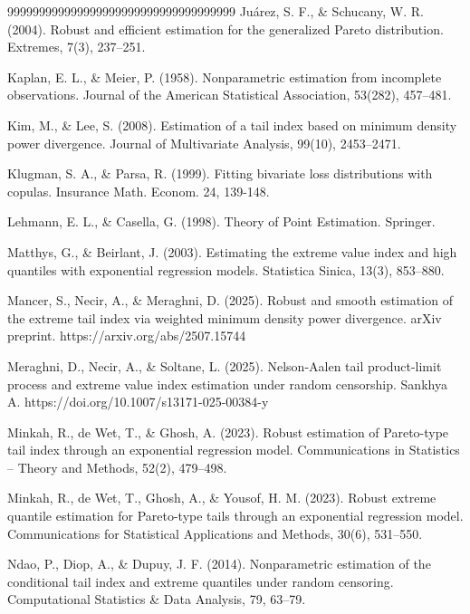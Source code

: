 \documentclass[reqno,openbib,runningheads,a4paper,12pt]{amsart}%
\begin{document}
\begin{thebibliography}{999999999999999999999999999999999999}
Ju\'{a}rez, S. F., \&
Schucany, W. R. (2004). Robust and efficient estimation for the generalized
Pareto distribution. Extremes, 7(3), 237--251.

Kaplan, E. L., \& Meier, P. (1958).
Nonparametric estimation from incomplete observations. Journal of the American
Statistical Association, 53(282), 457--481.

Kim, M., \& Lee, S. (2008). Estimation of
a tail index based on minimum density power divergence. Journal of
Multivariate Analysis, 99(10), 2453--2471.

Klugman, S. A., \& Parsa, R.
(1999). Fitting bivariate loss distributions with copulas. Insurance Math.
Econom. 24, 139-148.

Lehmann, E. L., \& Casella, G.
(1998). Theory of Point Estimation. Springer.

Matthys, G., \& Beirlant, J.
(2003). Estimating the extreme value index and high quantiles with exponential
regression models. Statistica Sinica, 13(3), 853--880.

Mancer, S., Necir, A., \&
Meraghni, D. (2025). Robust and smooth estimation of the extreme tail index
via weighted minimum density power divergence. arXiv preprint. https://arxiv.org/abs/2507.15744

Meraghni, D., Necir, A., \&
Soltane, L. (2025). Nelson-Aalen tail product-limit process and extreme value
index estimation under random censorship. Sankhya A. https://doi.org/10.1007/s13171-025-00384-y

Minkah, R., de Wet, T., \&
Ghosh, A. (2023). Robust estimation of Pareto-type tail index through an
exponential regression model. Communications in Statistics -- Theory and
Methods, 52(2), 479--498.

Minkah, R., de Wet, T.,
Ghosh, A., \& Yousof, H. M. (2023). Robust extreme quantile estimation for
Pareto-type tails through an exponential regression model. Communications for
Statistical Applications and Methods, 30(6), 531--550.

Ndao, P., Diop, A., \& Dupuy, J.
F. (2014). Nonparametric estimation of the conditional tail index and extreme
quantiles under random censoring. Computational Statistics \& Data Analysis,
79, 63--79.


\end{thebibliography}
\end{document}
